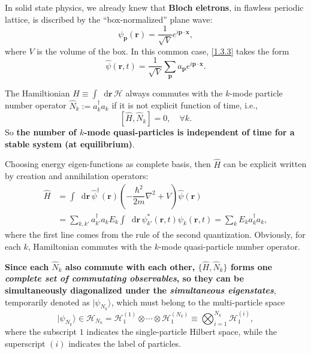 \documentclass[b5paper,10pt,UTF8]{book}
\newcommand*\dd{\mathop{}\!\mathrm{d}}
\numberwithin{equation}{section}
\begin{document}
		\begin{Example}
			\par
			In solid state physics, we already knew that \textbf{Bloch eletrons}, in flawless periodic lattice, is discribed by the ``box-normalized'' plane wave:
			$$\psi_{\bm{p}}(\bm{r})=\dfrac{1}{\sqrt{V}}e^{i\bm{p\cdot x}},$$
			where $V$ is the volume of the box. In this common case, \eqref{1.3.3} takes the form
			\begin{equation}\label{1.3.5}
				\hat{\psi}(\bm{r},t)=\dfrac{1}{\sqrt{V}}\sum_{\bm{p}}a_{\bm{p}}e^{i\bm{p\cdot x}}.
			\end{equation}
		\end{Example}
		\begin{Proposition}
			The Hamiltionian $\hat{H}\equiv\int\dd\bm{r}\,\mathcal{H}$ always commutes with the $k$-mode particle number operator $\hat{N}_k:=a_k^\dagger a_k$ if it is not explicit function of time, i.e.,
			\begin{equation}\label{1.3.6}
				[\hat{H},\hat{N}_{k}]=0,\quad\forall k.
			\end{equation}
			So \textbf{the number of $k$-mode quasi-particles is independent of time for a stable system (at equilibrium)}.
		\end{Proposition}
		\begin{Proof}
			Choosing energy eigen-functions as complete basis, then $\hat{H}$ can be explicit written by creation and annihilation operators:
			\begin{align}
				\hat{H}&=\int\dd\bm{r}\,\hat{\psi}^\dagger(\bm{r})\left(-\dfrac{\hbar^2}{2m}\nabla^2+V\right)\hat{\psi}(\bm{r})\nonumber\\
				&=\sum_{k,k'}a_{k'}^\dagger a_k E_k \int\dd\bm{r}\,\psi_{k'}^*(\bm{r},t)\psi_k(\bm{r},t)\nonumber=\sum_k E_ka_k^\dagger a_k,\label{1.3.7}
			\end{align}
			where the first line comes from the rule of the second quantization. Obviously, for each $k$, Hamiltonian commutes with the $k$-mode quasi-particle number operator.
		\end{Proof}
		\textbf{Since each $\hat{N}_k$ also commute with each other, $\{\hat{H},\hat{N}_{k}\}$ forms one \emph{complete set of commutating observables}, so they can be simultaneously diagonalized under the \emph{simultaneous eigenstates}}, temporarily denoted as $|\psi_{N_k}\rangle$, which must belong to the multi-particle space
		$$|\psi_{N_k}\rangle\in\mathcal{H}_{N_k}=\mathcal{H}_1^{(1)}\otimes\cdots\otimes\mathcal{H}_1^{(N_k)}\equiv\bigotimes_{i=1}^{N_k}\mathcal{H}_1^{(i)},$$
		where the subscript $1$ indicates the single-particle Hilbert space, while the superscript $(i)$ indicates the label of particles.
\end{document}
